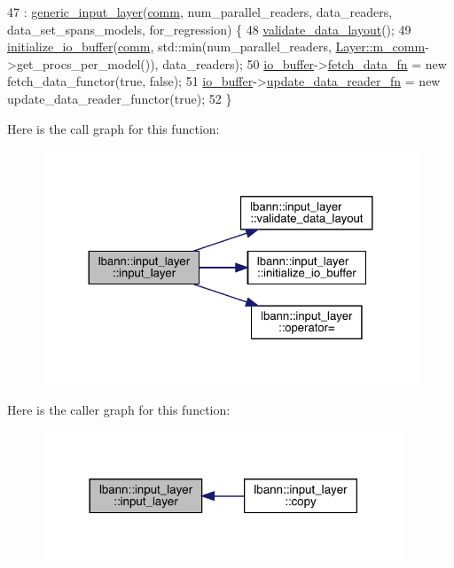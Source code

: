 \begin{DoxyCode}
47     : \hyperlink{classlbann_1_1generic__input__layer_a0c7ce1625cd2be2368822c2662346538}{generic\_input\_layer}(\hyperlink{file__io_8cpp_ab048c6f9fcbcfaa57ce68b00263dbebe}{comm}, num\_parallel\_readers, data\_readers, 
      data\_set\_spans\_models, for\_regression) \{
48     \hyperlink{classlbann_1_1input__layer_ae3c46c7e4d99b736ce8a3261abeac3e7}{validate\_data\_layout}();
49     \hyperlink{classlbann_1_1input__layer_a645fce2e882892ac0ad8c9b06ea6ed09}{initialize\_io\_buffer}(\hyperlink{file__io_8cpp_ab048c6f9fcbcfaa57ce68b00263dbebe}{comm}, std::min(num\_parallel\_readers, 
      \hyperlink{classlbann_1_1Layer_a5de05c52f22e0bbd7c703bec3ad4dbf2}{Layer::m\_comm}->get\_procs\_per\_model()), data\_readers);
50     \hyperlink{classlbann_1_1generic__input__layer_a9dfe8b9afaebc7a5bcb0177ee2ab428f}{io\_buffer}->\hyperlink{classlbann_1_1generic__io__buffer_a267170b4fd11dc60c782a9cb2b7b06cc}{fetch\_data\_fn} = \textcolor{keyword}{new} fetch\_data\_functor(\textcolor{keyword}{true}, \textcolor{keyword}{false});
51     \hyperlink{classlbann_1_1generic__input__layer_a9dfe8b9afaebc7a5bcb0177ee2ab428f}{io\_buffer}->\hyperlink{classlbann_1_1generic__io__buffer_a031eda7559a9e241afb3958b56088560}{update\_data\_reader\_fn} = \textcolor{keyword}{new} update\_data\_reader\_functor(\textcolor{keyword}{true});
52   \}
\end{DoxyCode}
Here is the call graph for this function\+:\nopagebreak
\begin{figure}[H]
\begin{center}
\leavevmode
\includegraphics[width=324pt]{classlbann_1_1input__layer_aad8b042899d86f5b7904d9d2653b5181_cgraph}
\end{center}
\end{figure}
Here is the caller graph for this function\+:\nopagebreak
\begin{figure}[H]
\begin{center}
\leavevmode
\includegraphics[width=306pt]{classlbann_1_1input__layer_aad8b042899d86f5b7904d9d2653b5181_icgraph}
\end{center}
\end{figure}
